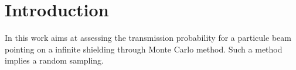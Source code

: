 \section{Introduction}
In this work aims at assessing the transmission probability for a 
particule beam pointing on a infinite shielding through Monte Carlo method. 
Such a method implies a random sampling. 